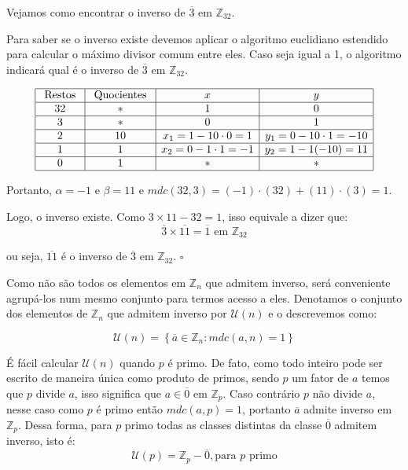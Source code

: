 \begin{Ex}
Vejamos como encontrar o inverso de $\overline{3}$ em $\mathbb{Z}_{32}$.

Para saber se o inverso existe devemos aplicar o algoritmo euclidiano estendido
para calcular o m\'{a}ximo divisor comum entre eles. Caso seja igual a 1, o algoritmo
indicar\'{a} qual \'{e} o inverso de $\overline{3}$ em $\mathbb{Z}_{32}$. 

\[
\begin{array}{|c|c|c|c|}\hline
\textrm{ Restos } & \textrm{ Quocientes } & x       								& y \\ \hline
				32 	    & \ast     							& 1      									& 0 \\ \hline
				3  			& \ast     							& 0       								& 1 \\ \hline
				2       & 10   					 	  		& x_{1}=1-10\cdot 0 = 1   & y_{1}=0-10\cdot 1=-10 \\ \hline
				1     	& 1    									& x_{2}=0-1\cdot 1=-1     & y_{2}=1-1(-10)=11 \\ \hline
				0    	  & 1    									& \ast         & \ast \\ \hline  
\end{array}
\]

Portanto, $\alpha=-1$ e $\beta=11$ e $mdc(32,3)=(-1)\cdot(32)+(11)\cdot(3)=1$. 

Logo, o inverso existe. Como $3\times 11-32=1$, isso equivale a dizer que: 
$$\overline{3}\times\overline{11}=\overline{1} \textrm{ em }\mathbb{Z}_{32}$$

ou seja, $\overline{11}$ \'{e} o inverso de $\overline{3}$ em $\mathbb{Z}_{32}$.
\hfill$\square$ 
\end{Ex}

Como n\~{a}o s\~{a}o todos os elementos em $\mathbb{Z}_{n}$ que admitem inverso, ser\'{a} conveniente agrup\'{a}-los num 
mesmo conjunto para termos acesso a eles. Denotamos o conjunto dos elementos de $\mathbb{Z}_{n}$ que admitem 
inverso por $\mathcal{U}(n)$ e o descrevemos como:

$$\mathcal{U}(n) = \left\{\overline{a} \in \mathbb{Z}_{n} : mdc(a,n) = 1\right\}$$

\'{E} f\'{a}cil calcular $\mathcal{U}(n)$ quando $p$ \'{e} primo. De fato, como todo inteiro pode ser 
escrito de maneira \'{u}nica como produto de primos, sendo $p$ um fator de $a$ temos que $p$ divide $a$,
isso significa que $a\in\overline{0}$ em $\mathbb{Z}_{p}$. Caso contr\'{a}rio $p$ n\~{a}o divide $a$, nesse caso 
como $p$ \'{e} primo ent\~{a}o $mdc(a, p)=1$, portanto $\overline{a}$ admite inverso em $\mathbb{Z}_{p}$. 
Dessa forma, para $p$ primo todas as classes distintas da 
classe $\overline{0}$ admitem inverso, isto \'{e}:
$$\mathcal{U}(p)=\mathbb{Z}_{p}-{\overline{0}}, \textrm{para } p  \textrm{ primo}$$

